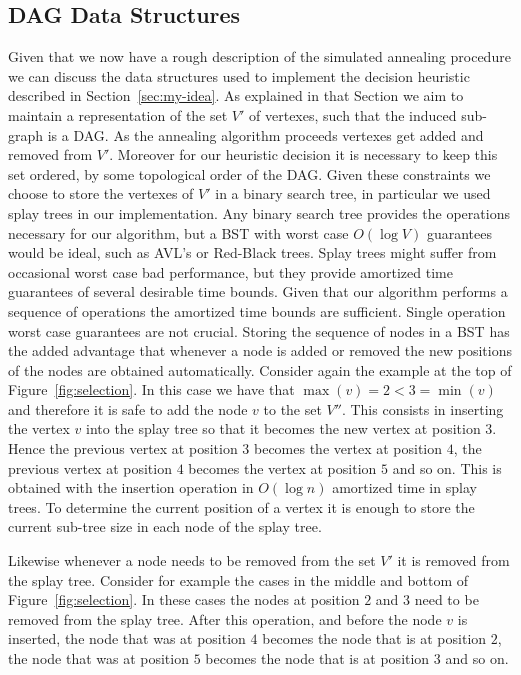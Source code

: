 \documentclass[a4paper]{article}
\begin{document}
\subsection{DAG Data Structures}
\label{sec:dag-data-structures}
%
Given that we now have a rough description of the simulated annealing
procedure we can discuss the data structures used to implement the decision
heuristic described in Section~\ref{sec:my-idea}. As explained in that
Section we aim to maintain a representation of the set $V'$ of vertexes,
such that the induced sub-graph is a DAG. As the annealing algorithm
proceeds vertexes get added and removed from $V'$. Moreover for our
heuristic decision it is necessary to keep this set ordered, by some
topological order of the DAG. Given these constraints we choose to store the
vertexes of $V'$ in a binary search tree, in particular we used splay trees
in our implementation. Any binary search tree provides the operations
necessary for our algorithm, but a BST with worst case $O(\log V)$
guarantees would be ideal, such as AVL's or Red-Black trees. Splay trees
might suffer from occasional worst case bad performance, but they provide
amortized time guarantees of several desirable time bounds. Given that our
algorithm performs a sequence of operations the amortized time bounds are
sufficient. Single operation worst case guarantees are not crucial.
Storing the sequence of nodes in a BST has the added advantage that
whenever a node is added or removed the new positions of the nodes are
obtained automatically. Consider again the example at the top of
Figure~\ref{fig:selection}. In this case we have that
$\max(v) = 2 < 3 = \min(v)$ and therefore it is safe to add the node $v$ to
the set $V''$. This consists in inserting the vertex $v$ into the splay
tree so that it becomes the new vertex at position $3$. Hence the previous
vertex at position $3$ becomes the vertex at position $4$, the previous
vertex at position $4$ becomes the vertex at position $5$ and so on. This
is obtained with the insertion operation in $O(\log n)$ amortized time in
splay trees. To determine the current position of a vertex it is enough to
store the current sub-tree size in each node of the splay tree.

Likewise whenever a node needs to be removed from the set $V'$ it is removed
from the splay tree. Consider for example the cases in the middle and bottom
of Figure~\ref{fig:selection}. In these cases the nodes at position $2$ and
$3$ need to be removed from the splay tree. After this operation, and
before the node $v$ is inserted, the node that was at position $4$ becomes
the node that is at position $2$, the node that was at position $5$ becomes
the node that is at position $3$ and so on.
\end{document}
